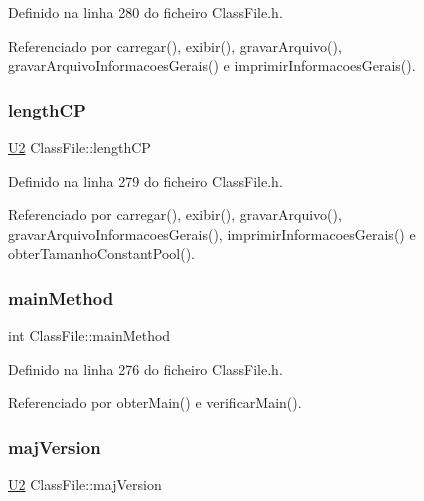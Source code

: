 Definido na linha 280 do ficheiro Class\+File.\+h.



Referenciado por carregar(), exibir(), gravar\+Arquivo(), gravar\+Arquivo\+Informacoes\+Gerais() e imprimir\+Informacoes\+Gerais().

\mbox{\label{classClassFile_acde5006251ffd25149efa4d6fb725cf5}} 
\subsubsection{\texorpdfstring{length\+CP}{lengthCP}}
{\footnotesize\ttfamily \hyperlink{BasicTypes_8h_a90240657108b1b457eef9d3f76e0202e}{U2} Class\+File\+::length\+CP\hspace{0.3cm}{\ttfamily [private]}}



Definido na linha 279 do ficheiro Class\+File.\+h.



Referenciado por carregar(), exibir(), gravar\+Arquivo(), gravar\+Arquivo\+Informacoes\+Gerais(), imprimir\+Informacoes\+Gerais() e obter\+Tamanho\+Constant\+Pool().

\mbox{\label{classClassFile_ac1cdef340faa0bd945b2236057433978}} 
\subsubsection{\texorpdfstring{main\+Method}{mainMethod}}
{\footnotesize\ttfamily int Class\+File\+::main\+Method\hspace{0.3cm}{\ttfamily [private]}}



Definido na linha 276 do ficheiro Class\+File.\+h.



Referenciado por obter\+Main() e verificar\+Main().

\mbox{\label{classClassFile_a40bd108a13debb86701cf31742572686}} 
\subsubsection{\texorpdfstring{maj\+Version}{majVersion}}
{\footnotesize\ttfamily \hyperlink{BasicTypes_8h_a90240657108b1b457eef9d3f76e0202e}{U2} Class\+File\+::maj\+Version\hspace{0.3cm}{\ttfamily [private]}}




